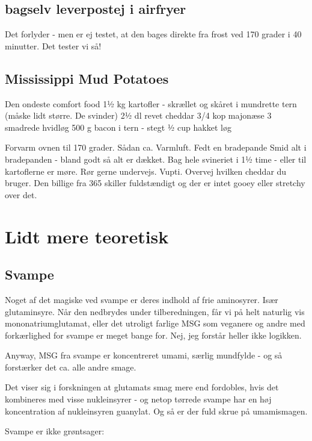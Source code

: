 \documentclass[
]{book}
\begin{document}
\section{bagselv leverpostej i airfryer}\label{bagselv-leverpostej-i-airfryer}

Det forlyder - men er ej testet, at den bages direkte fra
frost ved 170 grader i 40 minutter.
Det tester vi så!

\section{Mississippi Mud Potatoes}\label{mississippi-mud-potatoes}

Den ondeste comfort food
1½ kg kartofler - skrællet og skåret i mundrette tern (måske lidt større. De svinder)
2½ dl revet cheddar
3/4 kop majonæse
3 smadrede hvidløg
500 g bacon i tern - stegt
½ cup hakket løg

Forvarm ovnen til 170 grader. Sådan ca. Varmluft.
Fedt en bradepande
Smid alt i bradepanden - bland godt så alt er dækket.
Bag hele svineriet i 1½ time - eller til kartoflerne er møre.
Rør gerne undervejs.
Vupti. Overvej hvilken cheddar du bruger. Den billige fra 365 skiller
fuldstændigt og der er intet gooey eller stretchy over det.

\chapter{Lidt mere teoretisk}\label{lidt-mere-teoretisk}

\section{Svampe}\label{svampe}

Noget af det magiske ved svampe er deres indhold af frie aminosyrer. Især
glutaminsyre. Når den nedbrydes under tilberedningen, får vi på helt naturlig
vis mononatriumglutamat, eller det utroligt farlige MSG som veganere og andre
med forkærlighed for svampe er meget bange for. Nej, jeg forstår heller ikke
logikken.

Anyway, MSG fra svampe er koncentreret umami, særlig mundfylde - og så forstærker
det ca. alle andre smage.

Det viser sig i forskningen at glutamats smag mere end fordobles, hvis det kombineres
med visse nukleinsyrer - og netop tørrede svampe har en høj koncentration af
nukleinsyren guanylat. Og så er der fuld skrue på umamismagen.

Svampe er ikke grøntsager:
\end{document}
